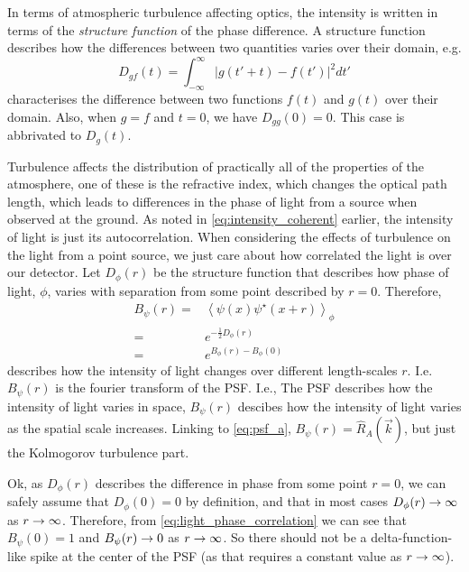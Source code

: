 In terms of atmospheric turbulence affecting optics, the intensity is written in terms of the \emph{structure function} of the phase difference. A structure function describes how the differences between two quantities varies over their domain, e.g.
\[
	D_{gf}(t) = \int_{-\infty}^{\infty} |g(t'+t) - f(t')|^2 dt'
\]
characterises the difference between two functions $f(t)$ and $g(t)$ over their domain. Also, when $g=f$ and $t=0$, we have $D_{gg}(0) = 0$. This case is abbrivated to $D_g(t)$.

Turbulence affects the distribution of practically all of the properties of the atmosphere, one of these is the refractive index, which changes the optical path length, which leads to differences in the phase of light from a source when observed at the ground. As noted in \eqref{eq:intensity_coherent} earlier, the intensity of light is just its autocorrelation. When considering the effects of turbulence on the light from a point source, we just care about how correlated the light is over our detector. Let $D_\phi(r)$ be the structure function that describes how phase of light, $\phi$, varies with separation from some point described by $r=0$. Therefore,
\begin{align}
	B_\psi(r) =& \left< \psi(x)\psi^\star(x+r) \right>_\phi 
		 \nonumber \\
		=& e^{-\frac{1}{2}D_\phi(r)} \\
		=& e^{B_\phi(r) - B_\phi(0)}
		\label{eq:light_phase_correlation}
\end{align}
describes how the intensity of light changes over different length-scales $r$. I.e. $B_\psi(r)$ is the fourier transform of the PSF. I.e., The PSF describes how the intensity of light varies in space, $B_\psi(r)$ descibes how the intensity of light varies as the spatial scale increases. Linking to \eqref{eq:psf_a}, $B_\psi(r) = \hat{R}_A(\vec{k})$, but just the Kolmogorov turbulence part.

Ok, as $D_\phi(r)$ describes the difference in phase from some point $r=0$, we can safely assume that $D_\phi(0)=0$ by definition, and that in most cases $D_\phi(r) \rightarrow \infty$ as $r \rightarrow \infty$. Therefore, from \eqref{eq:light_phase_correlation} we can see that $B_\psi(0)=1$ and $B_\psi(r) \rightarrow 0$ as $r \rightarrow \infty$. So there should not be a delta-function-like spike at the center of the PSF (as that requires a constant value as $r \rightarrow \infty$).

